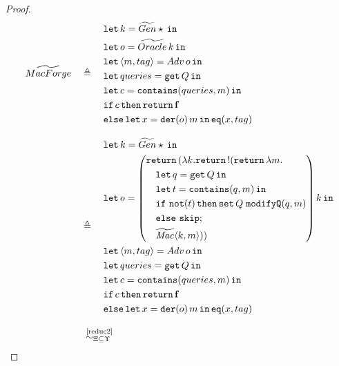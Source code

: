\begin{proof}

\small{
\begin{align*}
    \widetilde{MacForge} &\quad\triangleq\quad
    \begin{aligned}
        &\letin{k = \widetilde{Gen} \star}{} \\
        &\letin{o = \widetilde{Oracle}\, k}{} \\
        &\letin{\lis{m,tag} = Adv\, o}{} \\
        &\letin{queries = \get Q}{} \\
        &\letin{c=\mathtt{contains}(queries, m)}{} \\
        &\mathtt{if}\, c\, \mathtt{then}\, \return \false \\
        &\mathtt{else}\,\letin{x=\mathtt{der}(o)\, m}{\mathtt{eq}(x,tag)}
    \end{aligned}
    \\[2ex]
    &\quad\triangleq\quad
    \begin{aligned}
        &\letin{k = \widetilde{Gen} \star}{} \\
        &\mathtt{let}\, o = \left(
        \begin{aligned}
            &\return(\lambda k.\return \bang(\return \lambda m. \\
            &\quad \letin{q=\get Q}{} \\
            &\quad \letin{t=\mathtt{contains}(q,m)}{} \\
            &\quad \mathtt{if}\ \mathtt{not}(t)\,\mathtt{then} \,\mathtt{set}\,Q\;\mathtt{modifyQ}(q,m) \\
            &\quad \mathtt{else}\ \mathtt{skip}; \\
            &\quad \mathit{\widetilde{Mac}}\lis{k,m}))
        \end{aligned}
        \right) k \,\mathtt{in}\\
        &\letin{\lis{m,tag} = Adv\, o}{} \\
        &\letin{queries = \get Q}{} \\
        &\letin{c=\mathtt{contains}(queries, m)}{} \\
        &\mathtt{if}\, c\, \mathtt{then}\, \return \false \\
        &\mathtt{else}\,\letin{x=\mathtt{der}(o)\, m}{\mathtt{eq}(x,tag)}
    \end{aligned}
    \\[2ex]
    &\quad\overset{\text{~\ref{reduc2}}}{\simcontext}\quad
    \begin{aligned}

\end{aligned}
\end{align*}}
\end{proof}
